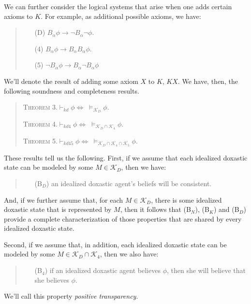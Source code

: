 We can further consider the logical systems that arise when one adds certain axioms to $K$.
For example, as additional possible axioms, we have:

\begin{quote}
\begin{itemize}
\item[(D)]\quad $B_\alpha \phi \rightarrow \lnot B_\alpha \lnot \phi$.
\item[(4)]\quad $B_\alpha \phi \rightarrow B_\alpha B_\alpha \phi$.
\item[(5)]\quad $\lnot B_\alpha \phi \rightarrow B_\alpha \lnot B_\alpha \phi$
\end{itemize}
\end{quote}


We'll denote the result of adding some axiom $X$ to $K$, $KX$.
We have, then, the following soundness and completeness results.
\begin{quote}
\textsc{Theorem 3.}\quad $\vdash_{kd} \phi \Leftrightarrow \; \models_{\mathcal{K}_D} \phi$.

\textsc{Theorem 4.}\quad $\vdash_{kd4} \phi \Leftrightarrow \; \models_{\mathcal{K}_D \cap \mathcal{K}_4} \phi$.

\textsc{Theorem 5.}\quad $\vdash_{kd45} \phi \Leftrightarrow \; \models_{\mathcal{K}_D \cap \mathcal{K}_4 \cap \mathcal{K}_5} \phi$.
\end{quote}
These results tell us the following.
First, if we assume that each idealized doxastic state can be modeled by some $M \in \mathcal{K}_D$, then we have:
\begin{quote}
\begin{itemize}
\item[(B$_D$)] an idealized doxastic agent's beliefs will be consistent.
\end{itemize}
\end{quote}
And, if we further assume that, for each $M \in \mathcal{K}_D$, there is some idealized doxastic state that is represented by $M$, then it follows that (B$_N$), (B$_K$) and (B$_D$) provide a complete characterization of those properties that are shared by every idealized doxastic state. 

Second, if we assume that, in addition, each idealized doxastic state can be modeled by some $M \in \mathcal{K}_D \cap \mathcal{K}_4$, then we also have:
\begin{quote}
\begin{itemize}
\item[(B$_4$)] if an idealized doxastic agent believes $\phi$, then she will believe that she believes $\phi$. 
\end{itemize}
\end{quote}
We'll call this property \textit{positive transparency}.

